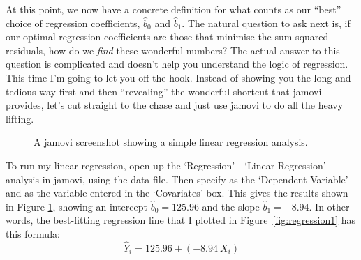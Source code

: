 At this point, we now have a concrete definition for what counts as our ``best'' choice of regression coefficients, $\hat{b}_0$ and $\hat{b}_1$. The natural question to ask next is,  if our optimal regression coefficients are those that minimise the sum squared residuals, how do we {\it find} these wonderful numbers? The actual answer to this question is complicated and doesn't help you understand the logic of regression.  This time I'm going to let you off the hook. Instead of showing you the long and tedious way first and then ``revealing'' the wonderful shortcut that jamovi provides, let's cut straight to the chase and just use jamovi to do all the heavy lifting. 


\begin{figure}[!htb]
\begin{center}
\caption{A jamovi screenshot showing a simple linear regression analysis.}
\HR
\label{fig:reg1}
\end{center}
\end{figure}

To run my linear regression, open up the `Regression' - `Linear Regression' analysis in jamovi, using the  data file. Then specify  as the `Dependent Variable' and  as the variable entered in the `Covariates' box. This gives the results shown in Figure \ref{fig:reg1}, showing an intercept $\hat{b}_0 = 125.96$ and the slope $\hat{b}_1 = -8.94$. In other words, the best-fitting regression line that I plotted in Figure~\ref{fig:regression1} has this formula:
$$
\hat{Y}_i = 125.96 + (-8.94 \ X_i)
$$ 

